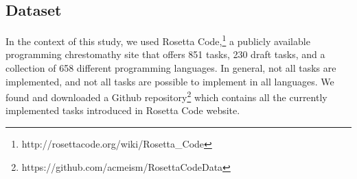 

\subsection{Dataset}
In the context of this study, we used Rosetta 
Code,\footnote{http://rosettacode.org/wiki/Rosetta\_Code} a 
publicly available programming chrestomathy site that offers 
851 tasks, 230 draft tasks, and a collection of 658 different 
programming languages. In general, not all tasks are implemented, and not all tasks are possible to implement in all languages.  
We found and downloaded a Github repository\footnote{https://github.com/acmeism/RosettaCodeData} 
which contains all the currently implemented tasks introduced in 
Rosetta Code website.

